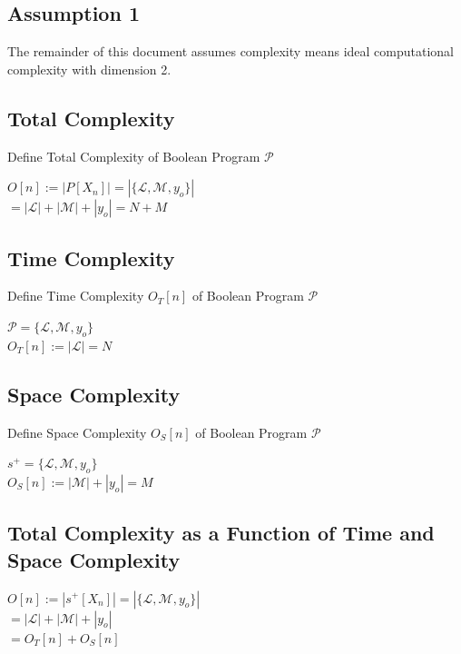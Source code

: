 \documentclass[11pt]{article}
\begin{document}
\subsection{Assumption 1}
The remainder of this document assumes complexity means ideal computational complexity with dimension 2.


\subsection{Total Complexity}
Define Total Complexity of Boolean Program $\mathcal{P}$
\begin{center}
\vspace{.5mm}
$O[n] :=  |P[X_n]| = |\{\mathcal{L},\mathcal{M},y_o\}|$
\\ \vspace{4mm}
$
= |\mathcal{L}| + |\mathcal{M}| + |y_o| = N + M
$
\end{center}






\subsection{Time Complexity}
Define Time Complexity $O_T[n]$ of Boolean Program $\mathcal{P}$
\begin{center}
\vspace{.5mm}
$
\mathcal{P} = \{ \mathcal{L},\mathcal{M},y_o\}
$
\\ \vspace{3mm}
$
O_T[n] := |\mathcal{L}| = N
$
\end{center}



\subsection{Space Complexity}
Define Space Complexity $O_S[n]$ of Boolean Program $\mathcal{P}$
\begin{center}
\vspace{.5mm}
$
s^+ = \{ \mathcal{L},\mathcal{M},y_o\}
$
\\ \vspace{2mm}
$
O_S[n] := |\mathcal{M}| + |y_o| = M
$
\end{center}



\subsection{Total Complexity as a Function of Time and Space Complexity}
\begin{center}
\vspace{.5mm}
$
O[n] :=  |s^+[X_n]| = |\{\mathcal{L},\mathcal{M},y_o\}|
$
\\ \vspace{2mm}
$
= |\mathcal{L}| + |\mathcal{M}| + |y_o|
$
\\ \vspace{2mm}
$
= O_T[n] + O_S[n]
$
\end{center}
\end{document}

